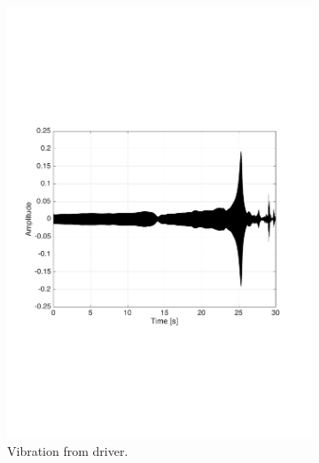 \begin{figure}[H]
\centering
\begin{subfigure}[t]{0.335\textwidth}
	\includegraphics[width=1\textwidth]{figures/raw_driver19.pdf}
	\caption{Vibration from driver.}
	\label{fig:raw_driver19}
\end{subfigure}
\begin{subfigure}[t]{0.3\textwidth}

\end{subfigure}
\end{figure}
